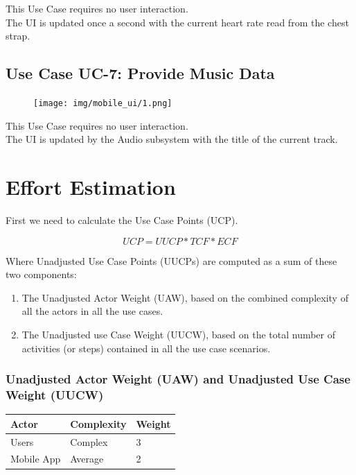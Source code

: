 \documentclass[letterpaper,english, 12pt]{scrreprt}
\begin{document}
This Use Case requires no user interaction.\\
The UI is updated once a second with the current heart rate read from the chest strap.

\subsection{Use Case UC-7: Provide Music Data}
\begin{figure}[H]
	\centering
	\texttt{[image: img/mobile\_ui/1.png]}\\
\end{figure}

This Use Case requires no user interaction.\\
The UI is updated by the Audio subsystem with the title of the current track.

\section{Effort Estimation}

First we need to calculate the Use Case Points (UCP).

\begin{equation}
UCP = UUCP* TCF *ECF
\end{equation}

Where Unadjusted Use Case Points (UUCPs) are computed as a sum of these two components:

\begin{enumerate}
\item The Unadjusted Actor Weight (UAW), based on the combined complexity of all the actors in all the use cases.
\item The Unadjusted use Case Weight (UUCW), based on the total number of activities (or steps) contained in all the use case scenarios.
\end{enumerate}


\subsubsection{Unadjusted Actor Weight (UAW) and Unadjusted Use Case Weight (UUCW)}
\begin{center}
        \begin{tabular}{|C{3cm}|C{3cm}|C{3cm}|}
                \hline
                        Actor & Complexity & Weight \\
                \hline
                       Users & Complex & 3 \\
                \hline
                       Mobile App & Average & 2 \\
                \hline
        \end{tabular}
\end{center}
\end{document}

